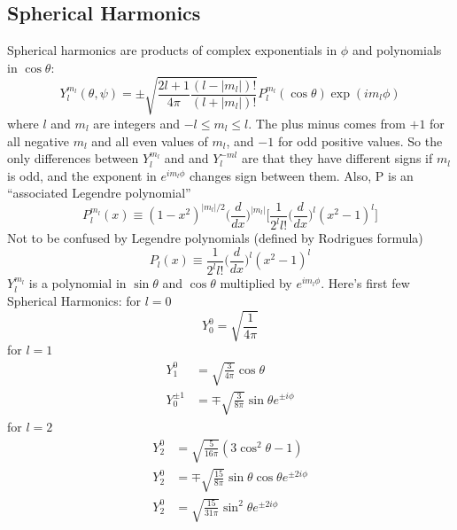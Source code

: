 \documentclass[../../main.tex]{subfiles}
\begin{document}
\subsection{Spherical Harmonics}
Spherical harmonics are products of complex exponentials in $\phi$ and polynomials in $\cos \theta$:
\begin{equation*}
    Y_l^{m_l}(\theta, \psi)=\pm \sqrt{ \frac{2l + 1}{4\pi} \frac{(l - |m_l|)!}{(l + |m_l|)!}}P_l^{m_l}(\cos\theta) \exp (im_l\phi )
\end{equation*}
where $l$ and $m_l$ are integers and $-l \leq m_l \leq l$. The plus minus comes from $+1$ for all negative $m_l$ and all even values of $m_l$, and $-1$ for odd positive values. So the only differences between $Y^{m_l}_l$ and and $Y^{-ml}_l$ are that they have different signs if $m_l$ is odd, and the exponent in $e^{im_l\phi}$ changes sign between them. Also, P is an “associated Legendre polynomial”
\begin{equation*}
    P_l^{m_l} (x)\equiv (1-x^2)^{|m_l|/2}\biggl(\frac{d}{dx}\biggr)^{|m_l|}\biggl[ \frac{1}{2^ll!}\biggl(\frac{d}{dx}\biggr)^l(x^2-1)^l\biggr]
\end{equation*}
Not to be confused by Legendre polynomials (defined by Rodrigues formula)
\begin{equation*}
    P_l (x)\equiv \frac{1}{2^ll!}\biggl(\frac{d}{dx}\biggr)^l(x^2-1)^l
\end{equation*}
$Y^{m_l}_l$ is a polynomial in $\sin \theta$ and $\cos \theta$ multiplied by $e^{im_l\phi}$. Here's first few Spherical Harmonics: for $l=0$
\begin{equation*}
    Y_0^0=\sqrt{\frac{1}{4\pi}}
\end{equation*}
for $l=1$
\begin{align*}
    Y_1^0&=\sqrt{\frac{3}{4\pi}}\cos\theta \\
    Y_0^{\pm1}&=\mp\sqrt{\frac{3}{8 \pi}}\sin\theta e^{\pm i\phi}
\end{align*}
for $l = 2$
\begin{align*}
    Y_2^0&=\sqrt{\frac{5}{16 \pi}}(3\cos^2\theta-1) \\
    Y_2^0&=\mp\sqrt{\frac{15}{8 \pi}}\sin\theta \cos \theta e^{\pm 2i\phi}\\
    Y_2^0&=\sqrt{\frac{15}{31 \pi}}\sin^2\theta e^{\pm 2i\phi}
\end{align*}
\end{document}
